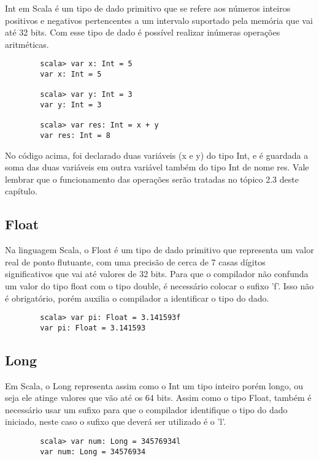 	 Int em Scala \'{e} um tipo de dado primitivo que se refere aos n\'{u}meros inteiros positivos e negativos pertencentes a um intervalo suportado pela mem\'{o}ria que vai at\'{e} 32 bits. Com esse tipo de dado \'{e} poss\'{i}vel realizar in\'{u}meras opera\c{c}\~{o}es aritm\'{e}ticas.
	 
	 \begin{lstlisting}
	 	scala> var x: Int = 5
	 	var x: Int = 5
	 	
	 	scala> var y: Int = 3
	 	var y: Int = 3
	 	
	 	scala> var res: Int = x + y
	 	var res: Int = 8
	 \end{lstlisting}
 
 	No c\'{o}digo acima, foi declarado duas vari\'{a}veis (x e y) do tipo Int, e \'{e} guardada a soma das duas vari\'{a}veis em outra vari\'{a}vel tamb\'{e}m do tipo Int de nome res. Vale lembrar que o funcionamento das opera\c{c}\~{o}es serão tratadas no tópico 2.3 deste cap\'{i}tulo.
 	
 	\subsection{Float}
 	
 	Na linguagem Scala, o Float \'{e} um tipo de dado primitivo que representa um valor real de ponto flutuante, com uma precis\~{a}o de cerca de 7 casas dígitos significativos que vai at\'{e} valores de 32 bits. Para que o compilador não confunda um valor do tipo float com o tipo double, \'{e} necess\'{a}rio colocar o sufixo 'f'. Isso não \'{e} obrigatório, por\'{e}m auxilia o compilador a identificar o tipo do dado. 
 	
 	\begin{lstlisting}
 		scala> var pi: Float = 3.141593f
 		var pi: Float = 3.141593
 	\end{lstlisting}
    
    \subsection{Long}
    
    Em Scala, o Long representa assim como o Int um tipo inteiro por\'{e}m longo, ou seja ele atinge valores que vão at\'{e} os 64 bits. Assim como o tipo Float, tamb\'{e}m \'{e} necess\'{a}rio usar um sufixo para que o compilador identifique o tipo do dado iniciado, neste caso o sufixo que deverá ser utilizado \'{e} o 'l'.
    
    \begin{lstlisting}
    	scala> var num: Long = 34576934l
    	var num: Long = 34576934
    \end{lstlisting}

